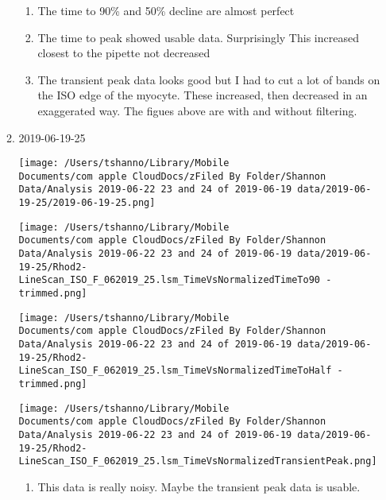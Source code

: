\documentclass[11pt]{article}
\begin{document}
\begin{enumerate}
\begin{enumerate}
\begin{center}
\end{center}
\begin{enumerate}
\item The time to 90\% and 50\% decline are almost perfect
\label{sec:orgf7422dc}
\item The time to peak showed usable data.  Surprisingly This increased closest to the pipette not decreased
\label{sec:org2faeb0c}
\item The transient peak data looks good but I had to cut a lot of bands on the ISO edge of the myocyte.  These increased, then decreased in an exaggerated way.  The figues above are with and without filtering.
\label{sec:orga7320e6}
\end{enumerate}
\item 2019-06-19-25
\label{sec:orgea4e17d}
\begin{center}
\texttt{[image: /Users/tshanno/Library/Mobile Documents/com~apple~CloudDocs/zFiled By Folder/Shannon Data/Analysis 2019-06-22 23 and 24 of 2019-06-19 data/2019-06-19-25/2019-06-19-25.png]}
\end{center}
\begin{center}
\texttt{[image: /Users/tshanno/Library/Mobile Documents/com~apple~CloudDocs/zFiled By Folder/Shannon Data/Analysis 2019-06-22 23 and 24 of 2019-06-19 data/2019-06-19-25/Rhod2-LineScan\_ISO\_F\_062019\_25.lsm\_TimeVsNormalizedTimeTo90 - trimmed.png]}
\end{center}
\begin{center}
\texttt{[image: /Users/tshanno/Library/Mobile Documents/com~apple~CloudDocs/zFiled By Folder/Shannon Data/Analysis 2019-06-22 23 and 24 of 2019-06-19 data/2019-06-19-25/Rhod2-LineScan\_ISO\_F\_062019\_25.lsm\_TimeVsNormalizedTimeToHalf - trimmed.png]}
\end{center}
\begin{center}
\texttt{[image: /Users/tshanno/Library/Mobile Documents/com~apple~CloudDocs/zFiled By Folder/Shannon Data/Analysis 2019-06-22 23 and 24 of 2019-06-19 data/2019-06-19-25/Rhod2-LineScan\_ISO\_F\_062019\_25.lsm\_TimeVsNormalizedTransientPeak.png]}
\end{center}
\begin{enumerate}
\item This data is really noisy.  Maybe the transient peak data is usable.
\label{sec:org9c6caf2}
\end{enumerate}
\end{enumerate}


\end{enumerate}
\end{document}
